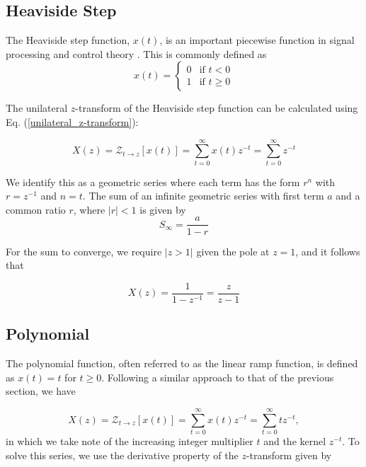 \documentclass[a4paper]{report}
\begin{document}
\subsection{Heaviside Step}\label{section:heaviside_step}
The Heaviside step function, $x(t)$, is an important piecewise function in signal processing and control theory \citep{proakis2007digital}. This is commonly defined as
\begin{equation}
	x(t) = 
	\begin{cases}
        0 & \text{if } t < 0 \\
        1 & \text{if } t \geq 0
    \end{cases}
\end{equation}

The unilateral $z$-transform of the Heaviside step function can be calculated using Eq. (\ref{unilateral_z-transform}):

\begin{equation}
X(z) = 	\mathcal{Z}_{t \rightarrow z}[x(t)] = \sum^{\infty}_{t = 0}x(t)z^{-t} = \sum^{\infty}_{t=0} z^{-t}
\end{equation}

We identify this as a geometric series where each term has the form $r^n$ with $r = z^{-1}$ and $n = t$. The sum of an infinite geometric series with first term $a$ and a common ratio $r$, where $|r| < 1$ is given by
\begin{equation}\label{equation:geometric_series}
S_\infty = \frac{a}{1-r}	
\end{equation}

For the sum to converge, we require $|z > 1|$ given the pole at $z = 1$, and it follows that

\begin{equation}
X(z) = \frac{1}{1 - z^{-1}} = \frac{z}{z - 1}
\end{equation}

\subsection{Polynomial}\label{section:polynomial}
The polynomial function, often referred to as the linear ramp function, is defined as $x(t) = t$ for $t \geq 0	$. Following a similar approach to that of the previous section, we have

\begin{equation}
X(z) = 	\mathcal{Z}_{t \rightarrow z}[x(t)] = \sum^{\infty}_{t = 0}x(t)z^{-t} = \sum^{\infty}_{t=0} tz^{-t},
\end{equation}
in which we take note of the increasing integer multiplier $t$ and the kernel $z^{-t}$. To solve this series, we use the derivative property of the $z$-transform  given by
\end{document}
